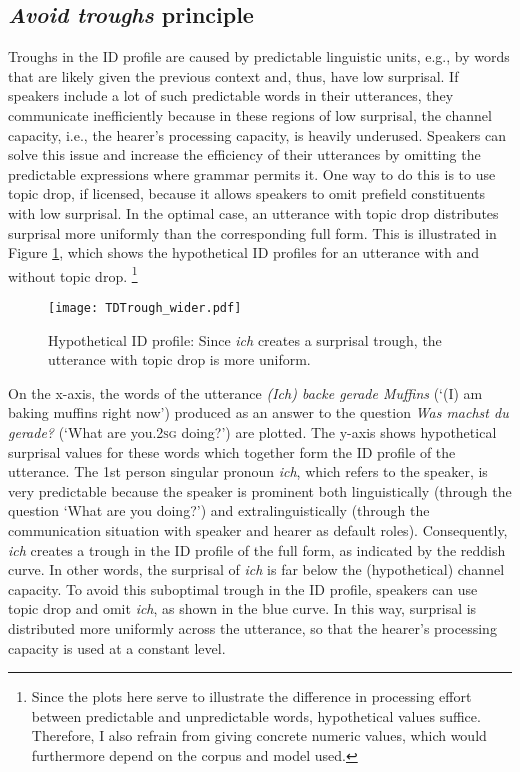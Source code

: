 \subsection{\textit{Avoid troughs} principle}\label{sec:avoid.troughs}
Troughs in the ID profile are caused by predictable  linguistic units, e.g., by words that are likely given the previous context and, thus, have low surprisal.
If speakers include a lot of such predictable words in their utterances, they communicate inefficiently because in these regions of low surprisal, the channel capacity,  i.e., the hearer's processing capacity, is heavily underused.
Speakers can solve this issue and increase the efficiency of their utterances by omitting the predictable  expressions where grammar permits it.
One way to do this is to use topic drop, if licensed, because it allows speakers to omit prefield constituents with low surprisal.
In the optimal case, an utterance with topic drop distributes surprisal more uniformly than the corresponding full form.
This is illustrated in Figure \ref{fig:tdtrough}, which shows the hypothetical ID profiles for an utterance with and without topic drop.%
\footnote{Since the plots here serve to illustrate the difference in processing effort between predictable and unpredictable words, hypothetical values suffice.
Therefore, I also refrain from giving concrete numeric values, which would furthermore depend on the corpus and model used.
}
%

\begin{figure}
\begin{center}
\texttt{[image: TDTrough\_wider.pdf]}
\caption{Hypothetical ID profile: Since \textit{ich} creates a surprisal trough, the utterance with topic drop is more uniform.}
\label{fig:tdtrough}
\end{center}
\end{figure}

On the x-axis, the words of the utterance \textit{(Ich) backe gerade Muffins} (`(I) am baking muffins right now') produced as an answer to the question \textit{Was machst du gerade?} (`What are you.\textsc{2sg} doing?') are plotted.
The y-axis shows hypothetical surprisal values for these words which together form the ID profile of the utterance.
The 1st person singular pronoun \textit{ich}, which refers to the speaker, is very predictable  because the speaker is prominent both linguistically (through the question `What are you doing?') and extralinguistically (through the communication situation with speaker and hearer as default roles).
Consequently, \textit{ich} creates a trough in the ID profile of the full form, as indicated by the reddish curve.
In other words, the surprisal of \textit{ich} is far below the (hypothetical) channel capacity.  
To avoid this suboptimal trough in the ID profile, speakers can use topic drop and omit \textit{ich}, as shown in the blue curve.
In this way, surprisal is distributed more uniformly across the utterance, so that the hearer's processing capacity is used at a constant level.

